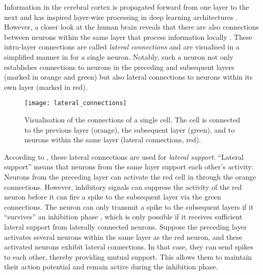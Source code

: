 Information in the cerebral cortex is propagated forward from one layer to the next and has inspired layer-wise processing in deep learning architectures .
However, a closer look at the human brain reveals that there are also connections between neurons within the same layer that process information locally .
These intra-layer connections are called \emph{lateral connections}  and are visualised in a simplified manner in  for a single neuron.
Notably, such a neuron not only establishes connections to neurons in the preceding and subsequent layers (marked in orange and green) but also lateral connections to neurons within its own layer (marked in red).

\begin{figure}[h]
    \centering
    \texttt{[image: lateral\_connections]}
    \caption[Lateral connections of a cell]{Visualisation of the connections of a single cell. The cell is connected to the previous layer (orange), the subsequent layer (green), and to neurons within the same layer (lateral connections, red).}
\end{figure}

According to , these lateral connections are used for \emph{lateral support}. ``Lateral support'' means that neurons from the same layer support each other's activity:
Neurons from the preceding layer can activate the red cell in  through the orange connections.
However, inhibitory signals can suppress the activity  of the red neuron before it can fire a spike to the subsequent layer via the green connections. The neuron can only transmit a spike to the subsequent layers if it ``survives'' an inhibition phase , which is only possible if it receives sufficient lateral support  from laterally connected neurons.
Suppose the preceding layer activates several neurons within the same layer as the red neuron, and these activated neurons exhibit lateral connections. In that case, they can send spikes to each other, thereby providing mutual support. This allows them to maintain their action potential and remain active during the inhibition phase.

